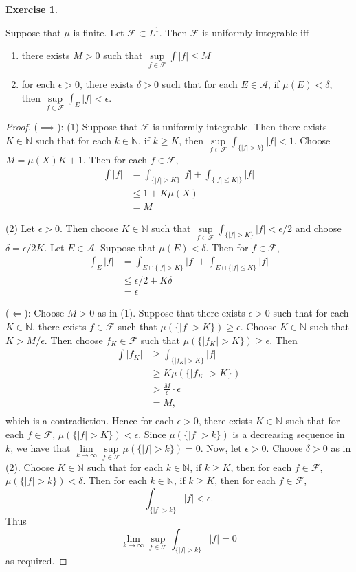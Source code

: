 \documentclass[12pt]{amsart}
\theoremstyle{definition}
\newtheorem{ex}[definition]{Exercise}
\newcommand{\del}{\delta}
\newcommand{\ep}{\epsilon}
\newcommand{\N}{\mathbb{N}}
\newcommand{\MA}{\mathcal{A}}
\newcommand{\MF}{\mathcal{F}}
\newcommand{\lex}[1]{\label{ex:#1}}
\begin{document}
	\begin{ex} \lex{00000} 
		
		Suppose that $\mu$ is finite. Let $\MF \subset L^1$. Then $\MF$ is uniformly integrable iff 
		\begin{enumerate}
			\item there exists $M >0$ such that $\sup\limits_{f \in \MF}\int |f| \leq M$
			\item for each $\ep >0$, there exists $\del >0$ such that for each $E \in \MA$, if $\mu(E) < \del$, then $\sup\limits_{f \in \MF} \int_E |f| < \ep$.
		\end{enumerate}
	\end{ex}
	
	\begin{proof}
		($\implies$): (1) Suppose that $\MF$ is uniformly integrable. Then there exists $K \in \N$ such that for each $k \in \N$, if $k \geq K$, then $\sup\limits_{f \in \MF} \int_{\{|f|>k\}} |f| < 1$. Choose $M = \mu(X)K + 1$. Then for each $f \in \MF$, 
		\begin{align*}
			\int |f| 
			&= \int_{\{|f|>K\}} |f| + \int_{\{|f| \leq K|\}}|f|\\
			& \leq 1 + K\mu(X)\\
			&=M
		\end{align*}
		
		(2) Let $\ep >0$. Then choose $K \in \N$ such that $\sup\limits_{f \in \MF}\int_{\{|f|>K\}} |f| < \ep/2$ and choose $\del = \ep/2K$. Let $E \in \MA$. Suppose that $\mu(E) < \del$. Then for $f \in \MF$, 
		\begin{align*}
			\int_E |f| 
			&= \int_{E \cap \{|f| > K\}} |f| + \int_{E \cap \{|f| \leq K\}} |f|\\
			& \leq \ep/2 + K\del \\
			&=  \ep
		\end{align*}
		
		($\Leftarrow$): Choose $M >0$ as in (1). Suppose that there exists $\ep >0$ such that for each $K \in \N$, there exists $f \in \MF$ such that $\mu(\{|f| > K\}) \geq \ep$. Choose $K \in \N$ such that $K > M/\ep$. Then choose $f_K \in \MF$ such that $\mu(\{|f_K| > K\}) \geq \ep$. Then 
		\begin{align*}
			\int |f_K| 
			&\geq \int_{\{|f_K| > K\}} |f|\\
			& \geq K\mu(\{|f_K| > K\})\\
			& > \frac{M}{\ep} \cdot \ep\\
			&= M, \\
		\end{align*}  
		which is a contradiction. Hence for each $\ep >0$, there exists $K \in \N$ such that for each $f \in \MF$, $\mu(\{|f| > K\}) < \ep$. Since $\mu(\{|f| > k\})$ is a decreasing sequence in $k$, we have that $\lim\limits_{k \rightarrow \infty} \sup\limits_{f \in \MF} \mu(\{|f| > k\}) = 0$. Now, let $\ep > 0$. Choose $\del >0$ as in (2). Choose $K \in \N$ such that for each $k \in \N$, if $k \geq K$, then for each $f \in \MF$, $\mu(\{|f| > k\}) < \del$. Then for each $k \in \N$, if $k \geq K$, then for each $f \in \MF$, 
		$$\int_{\{|f| > k\}} |f| < \ep.$$ Thus $$\lim\limits_{k \rightarrow \infty} \sup\limits_{f \in \MF} \int_{\{|f|>k\}} |f| = 0$$ as required.
		

\end{proof}
\end{document}
